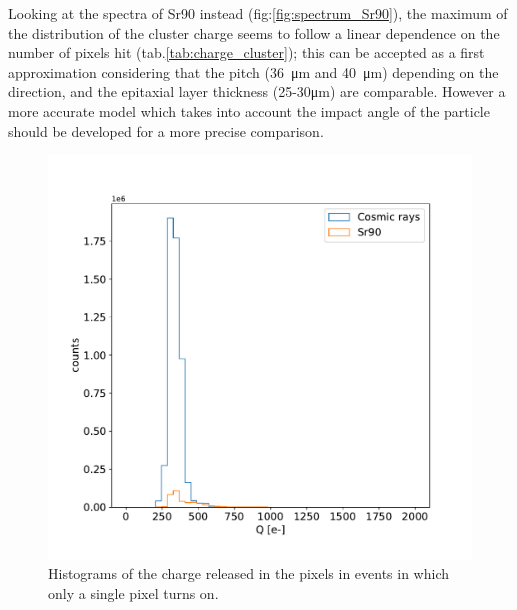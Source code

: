         Looking at the spectra of Sr90 instead (fig:\ref{fig:spectrum_Sr90}), the maximum of the distribution of the cluster charge seems to follow a linear dependence on the number of pixels hit (tab.\ref{tab:charge_cluster}); this can be accepted as a first approximation considering that the pitch (\SI{36}{\um} and \SI{40}{\um}) depending on the direction, and the epitaxial layer thickness (25-30\si{\um}) are comparable. 
        However a more accurate model which takes into account the impact angle of the particle should be developed for a more precise comparison.
        \begin{figure}
            \centering
            \includegraphics[width=.6\linewidth]{figures/charaterization/background.pdf}
            \caption{Histograms of the charge released in the pixels in events in which only a single pixel turns on.}
            \label{fig:single_pixel_cluster}
        \end{figure}         

